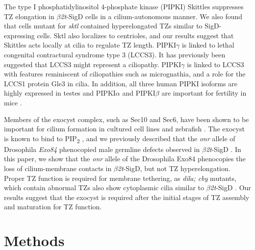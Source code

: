\documentclass[12pt, twoside, letterpaper]{article}
\newcommand{\PIP}{PIP\textsubscript{2}}
\newcommand{\sigd}{$\beta$\textit{2t}-SigD}
\begin{document}
The type I phosphatidylinositol 4-phosphate kinase (PIPKI) Skittles
suppresses TZ elongation in \sigd{} cells in a cilium-autonomous
manner.
We also found that cells mutant for \textit{sktl} contained hyperelongated
TZs similar to SigD-expressing cells.
Sktl also localizes to centrioles,
and our results suggest that Skittles acts locally at cilia to
regulate TZ length.
PIPKI$\gamma$ is linked to lethal congenital contractural syndrome
type 3 (LCCS3).
It has previously been suggested that LCCS3 might represent a ciliopathy.
PIPKI$\gamma$ is linked to LCCS3 with features reminiscent
of ciliopathies such as micrognathia, and a role for the LCCS1 protein
Gle3 in cilia.
In addition, all three human PIPKI isoforms are highly expressed in testes
and PIPKI$\alpha$ and PIPKI$\beta$ are important for fertility in mice
\citep{hasegawa2012phosphatidylinositol}.

Members of the exocyst complex, such as Sec10 and Sec6, have been shown
to be important for cilium formation in cultured cell lines and zebrafish
\citep{zuo2009exocyst, lobo2017exocyst, seixas2016arl13b}.
The exocyst is known to bind to \PIP{}
\citep{he2007exo70, zhang2008membrane}, and we previously described that
the \textit{onr} allele of Drosophila \textit{Exo84} phenocopied
male germline defects observed in \sigd{} \citep{fabian2010phosphatidylinositol}.
In this paper, we show that the \textit{onr} allele of the Drosophila Exo84
phenocopies the loss of cilium-membrane contacts in \sigd{},
but not TZ hyperelongation.
Proper TZ function is required for membrane tethering, as \textit{dila; cby}
mutants, which contain abnormal TZs also show cytoplasmic cilia similar to
\sigd{} \citep{vieillard2016transition}.
Our results suggest that the exocyst is required after the initial stages
of TZ assembly and maturation for TZ function.


\section{Methods}
\end{document}
